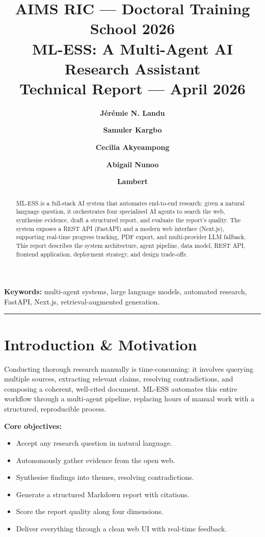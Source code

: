 \documentclass[10pt, twocolumn]{article}
\title{%
  \vspace{-1em}%
  {\large\textbf{AIMS RIC — Doctoral Training School 2026}}\\[4pt]
  {\Large\bfseries\color{aims-blue}
    ML-ESS: A Multi-Agent AI Research Assistant}\\[4pt]
  {\normalsize Technical Report — April 2026}%
}
\author[1]{\textbf{Jérémie N. Landu}}
\author[1]{\textbf{Samuler Kargbo}}
\author[1]{\textbf{Cecilia Akyeampong}}
\author[1]{\textbf{Abigail Nunoo}}
\author[1]{\textbf{Lambert}}
\affil[1]{%
  African Institute for Mathematical Sciences\\
  Research Innovation Centre (AIMS-RIC)\\
  Doctoral Training School 2026
}
\date{}
\begin{document}

\maketitle
\thispagestyle{fancy}

\begin{abstract}
ML-ESS is a full-stack AI system that automates end-to-end research: given a
natural language question, it orchestrates four specialised AI agents to search
the web, synthesise evidence, draft a structured report, and evaluate the
report's quality. The system exposes a REST API (FastAPI) and a modern web
interface (Next.js), supporting real-time progress tracking, PDF export, and
multi-provider LLM fallback. This report describes the system architecture,
agent pipeline, data model, REST API, frontend application, deployment
strategy, and design trade-offs.
\end{abstract}

\vspace{0.5em}
\noindent\textbf{Keywords:} multi-agent systems, large language models,
automated research, FastAPI, Next.js, retrieval-augmented generation.

\vspace{0.5em}
\hrule
\vspace{0.5em}

\section{Introduction \& Motivation}

Conducting thorough research manually is time-consuming: it involves querying
multiple sources, extracting relevant claims, resolving contradictions, and
composing a coherent, well-cited document. ML-ESS automates this entire
workflow through a multi-agent pipeline, replacing hours of manual work with a
structured, reproducible process.

\medskip
\noindent\textbf{Core objectives:}
\begin{itemize}
  \item Accept any research question in natural language.
  \item Autonomously gather evidence from the open web.
  \item Synthesise findings into themes, resolving contradictions.
  \item Generate a structured Markdown report with citations.
  \item Score the report quality along four dimensions.
  \item Deliver everything through a clean web UI with real-time feedback.
\end{itemize}
\end{document}
